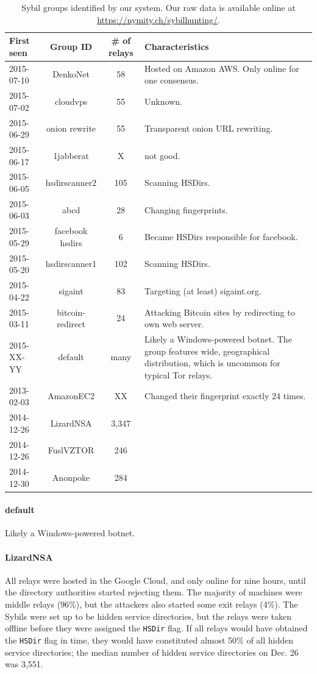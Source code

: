 \begin{table}[t]
\centering
\begin{tabular}{l c c p{10cm}}
\textbf{First seen} & \textbf{Group ID} & \textbf{\# of relays} & \textbf{Characteristics} \\
\hline
2015-07-10 & DenkoNet & 58 & Hosted on Amazon AWS.  Only online for one consensus. \\
2015-07-02 & cloudvps & 55 & Unknown. \\
2015-06-29 & onion rewrite & 55 & Transparent onion URL rewriting. \\
2015-06-17 & 1jabberat & X & not good. \\
2015-06-05 & hsdirscanner2 & 105 & Scanning HSDirs. \\
2015-06-03 & abcd & 28 & Changing fingerprints. \\
2015-05-29 & facebook hsdirs & 6 & Became HSDirs responsible for facebook.  \\
2015-05-20 & hsdirscanner1 & 102 & Scanning HSDirs. \\
2015-04-22 & sigaint & 83 & Targeting (at least) sigaint.org. \\
2015-03-11 & bitcoin-redirect & 24 & Attacking Bitcoin sites by redirecting to own web server. \\
2015-XX-YY & default & many & Likely a Windows-powered botnet.  The group
features wide, geographical distribution, which is uncommon for typical Tor
relays. \\
2013-02-03 & AmazonEC2 & XX & Changed their fingerprint exactly 24 times. \\
2014-12-26 & LizardNSA & 3,347 & \\
2014-12-26 & FuslVZTOR & 246 & \\
2014-12-30 & Anonpoke & 284 & \\
\end{tabular}
\caption{Sybil groups identified by our system.  Our raw data is available
online at {\normalfont\url{https://nymity.ch/sybilhunting/}}.}
\label{tab:sybils}
\end{table}

\paragraph{default}
Likely a Windows-powered botnet.

\paragraph{LizardNSA}
All relays were hosted in the Google Cloud, and only online for nine hours,
until the directory authorities started rejecting them.  The majority of
machines were middle relays (96\%), but the attackers also started some exit
relays (4\%).  The Sybils were set up to be hidden service directories, but the
relays were taken offline before they were assigned the \texttt{HSDir} flag.  If
all relays would have obtained the \texttt{HSDir} flag in time, they would have
constituted almost 50\% of all hidden service directories; the median number of
hidden service directories on Dec. 26 was 3,551.

